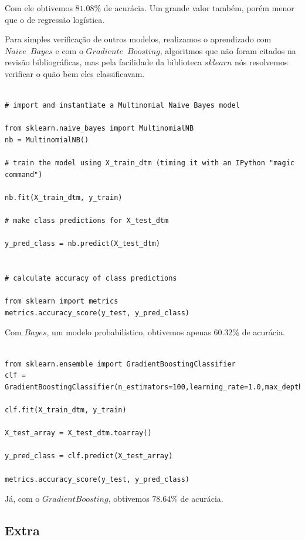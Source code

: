 \documentclass [12pt, a4paper] {article}
\begin{document}
Com ele obtivemos $81.08\%$ de acurácia. Um grande valor também, porém menor que o de regressão logística.

Para simples verificação de outros modelos, realizamos o aprendizado com $Naive \;\ Bayes$ e com o $Gradiente \;\ Boosting$, algoritmos que não foram citados na revisão bibliográficas, mas pela facilidade da biblioteca $sklearn$ nós resolvemos verificar o quão bem eles classificavam.

\begin{lstlisting}

# import and instantiate a Multinomial Naive Bayes model

from sklearn.naive_bayes import MultinomialNB
nb = MultinomialNB()

# train the model using X_train_dtm (timing it with an IPython "magic command")

nb.fit(X_train_dtm, y_train)

# make class predictions for X_test_dtm

y_pred_class = nb.predict(X_test_dtm)


# calculate accuracy of class predictions

from sklearn import metrics
metrics.accuracy_score(y_test, y_pred_class)

\end{lstlisting}

Com $Bayes$, um modelo probabilístico, obtivemos apenas $60.32\%$ de acurácia.

\begin{lstlisting}

from sklearn.ensemble import GradientBoostingClassifier
clf = GradientBoostingClassifier(n_estimators=100,learning_rate=1.0,max_depth=1,random_state=0)

clf.fit(X_train_dtm, y_train)

X_test_array = X_test_dtm.toarray()

y_pred_class = clf.predict(X_test_array)

metrics.accuracy_score(y_test, y_pred_class)

\end{lstlisting}

Já, com o $Gradient Boosting$, obtivemos $78.64\%$ de acurácia.



\subsection{Extra}
\end{document}
